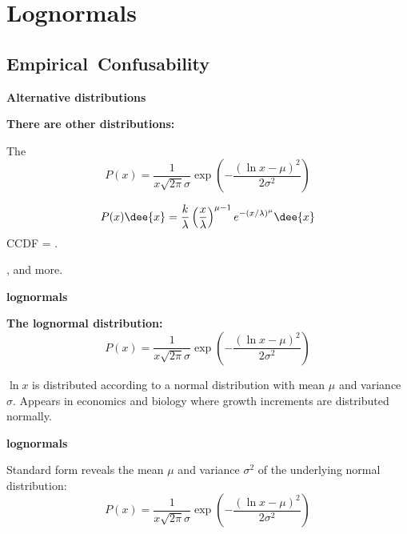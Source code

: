 
\section{Lognormals}

\subsection{Empirical\ Confusability}

  \textbf{Alternative distributions}

  \textbf{There are other  distributions:}
    
     
      The 
      $$
      P(x) = \frac{1}{x \sqrt{2\pi} \sigma}
      \exp 
      \left(
        -\frac{(\ln x-\mu)^2}
        {2\sigma^2}
      \right)
      $$
     
      $$ 
      P(x) \dee{x}
      =
      \frac{k}{\lambda}
      \left(
        \frac{x}{\lambda}
      \right)^{\mu-1} 
      e^{-(x/\lambda)^\mu}
      \dee{x}
      $$
      CCDF = .
     
      , and more.
    
  


  \textbf{lognormals}

  \textbf{The lognormal distribution:}
    $$
    P(x) = \frac{1}{x \sqrt{2\pi} \sigma}
    \exp 
    \left(
      -\frac{(\ln x-\mu)^2}
      {2\sigma^2}
    \right)
    $$
  
   $\ln x$ is distributed according 
    to a normal distribution with mean $\mu$ and variance $\sigma$.
   Appears in economics and biology where 
    growth increments are distributed normally.
  
  


  \textbf{lognormals}

  
  
   
    Standard form reveals the mean $\mu$ and
    variance $\sigma^2$ of the underlying 
    normal distribution:
    $$
    P(x) = \frac{1}{x \sqrt{2\pi} \sigma}
    \exp 
    \left(
      -\frac{(\ln x-\mu)^2}
      {2\sigma^2}
    \right)
    $$
  
